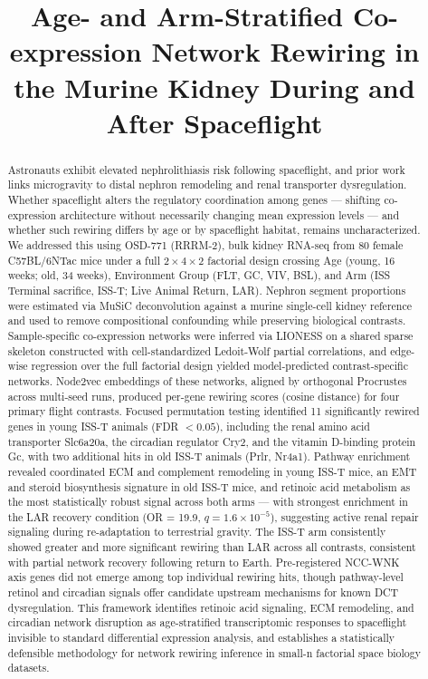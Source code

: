 \documentclass{tmsce}
\title{Age- and Arm-Stratified Co-expression Network Rewiring in the Murine Kidney During and After Spaceflight}
\affiliation{Middle College, The University of North Carolina at Greensboro, USA\\
\textit{Corresponding author:} imshahid@uncg.edu}
\begin{document}
\renewcommand{\journalname}{}
\makeatletter
\renewcommand{\tmsce@topstrip}{}
\makeatother
\fancyfoot[C]{}
\renewcommand{\footrulewidth}{0pt}
\maketitle

\begin{abstract}
Astronauts exhibit elevated nephrolithiasis risk following spaceflight, and prior work links microgravity to distal nephron remodeling and renal transporter dysregulation. Whether spaceflight alters the regulatory coordination among genes — shifting co-expression architecture without necessarily changing mean expression levels — and whether such rewiring differs by age or by spaceflight habitat, remains uncharacterized. We addressed this using OSD-771 (RRRM-2), bulk kidney RNA-seq from 80 female C57BL/6NTac mice under a full $2\times4\times2$ factorial design crossing Age (young, 16 weeks; old, 34 weeks), Environment Group (FLT, GC, VIV, BSL), and Arm (ISS Terminal sacrifice, ISS-T; Live Animal Return, LAR). Nephron segment proportions were estimated via MuSiC deconvolution against a murine single-cell kidney reference and used to remove compositional confounding while preserving biological contrasts. Sample-specific co-expression networks were inferred via LIONESS on a shared sparse skeleton constructed with cell-standardized Ledoit-Wolf partial correlations, and edge-wise regression over the full factorial design yielded model-predicted contrast-specific networks. Node2vec embeddings of these networks, aligned by orthogonal Procrustes across multi-seed runs, produced per-gene rewiring scores (cosine distance) for four primary flight contrasts. Focused permutation testing identified 11 significantly rewired genes in young ISS-T animals (FDR $< 0.05$), including the renal amino acid transporter Slc6a20a, the circadian regulator Cry2, and the vitamin D-binding protein Gc, with two additional hits in old ISS-T animals (Prlr, Nr4a1). Pathway enrichment revealed coordinated ECM and complement remodeling in young ISS-T mice, an EMT and steroid biosynthesis signature in old ISS-T mice, and retinoic acid metabolism as the most statistically robust signal across both arms — with strongest enrichment in the LAR recovery condition (OR = 19.9, $q = 1.6\times 10^{-5}$), suggesting active renal repair signaling during re-adaptation to terrestrial gravity. The ISS-T arm consistently showed greater and more significant rewiring than LAR across all contrasts, consistent with partial network recovery following return to Earth. Pre-registered NCC-WNK axis genes did not emerge among top individual rewiring hits, though pathway-level retinol and circadian signals offer candidate upstream mechanisms for known DCT dysregulation. This framework identifies retinoic acid signaling, ECM remodeling, and circadian network disruption as age-stratified transcriptomic responses to spaceflight invisible to standard differential expression analysis, and establishes a statistically defensible methodology for network rewiring inference in small-n factorial space biology datasets.
\end{abstract}
\end{document}
